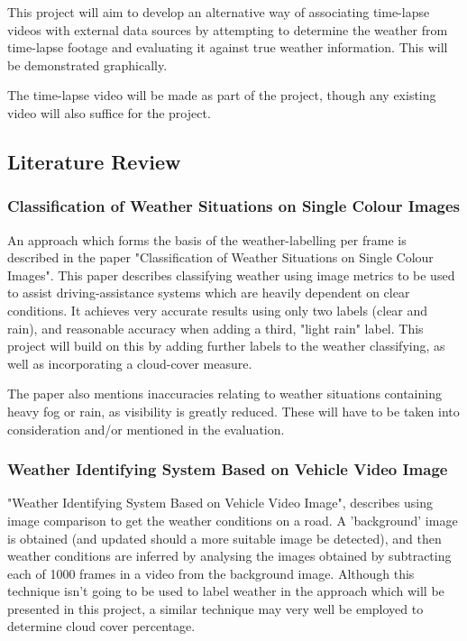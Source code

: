 \documentclass[12pt]{article}
\begin{document}
This project will aim to develop an alternative way of associating time-lapse videos with external data sources by attempting to determine the weather from time-lapse footage and evaluating it against true weather information. This will be demonstrated graphically.

The time-lapse video will be made as part of the project, though any existing video will also suffice for the project.

\subsection*{Literature Review}

\subsubsection*{Classification of Weather Situations on Single Colour Images}

An approach which forms the basis of the weather-labelling per frame is described in the paper "Classification of Weather Situations on Single Colour Images"\cite{classweather}. This paper describes classifying weather using image metrics to be used to assist driving-assistance systems which are heavily dependent on clear conditions. It achieves very accurate results using only two labels (clear and rain), and reasonable accuracy when adding a third, "light rain" label. This project will build on this by adding further labels to the weather classifying, as well as incorporating a cloud-cover measure.

The paper also mentions inaccuracies relating to weather situations containing heavy fog or rain, as visibility is greatly reduced. These will have to be taken into consideration and/or mentioned in the evaluation.

\subsubsection*{Weather Identifying System Based on Vehicle Video Image}

"Weather Identifying System Based on Vehicle Video Image"\cite{weatheridentify}, describes using image comparison to get the weather conditions on a road. A 'background' image is obtained (and updated should a more suitable image be detected), and then weather conditions are inferred by analysing the images obtained by subtracting each of 1000 frames in a video from the background image. Although this technique isn't going to be used to label weather in the approach which will be presented in this project, a similar technique may very well be employed to determine cloud cover percentage.
\end{document}
